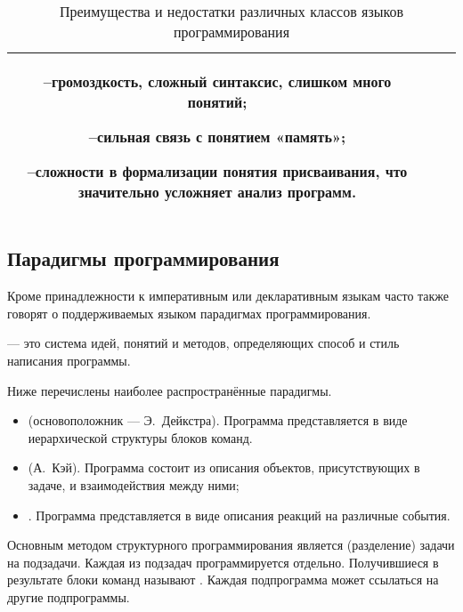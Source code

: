\begin{table}
\begin{centering}
\begin{tabular}{|c|c|c|}
\begin{minipage}[t]{0.42\columnwidth}
        --\enskip громоздкость, сложный синтаксис, слишком много
        понятий;
        
        --\enskip сильная связь с понятием «память»;
        
        --\enskip сложности в формализации понятия присваивания, что
        значительно усложняет анализ программ.
        \par\medskip
      \end{minipage}\\
      \hline 
    \end{tabular}
    \par
  \end{centering}
  
  \caption{Преимущества и недостатки различных классов языков программирования}
  \label{tbl:PLclasses}
\end{table}

\subsection{Парадигмы программирования}

Кроме принадлежности к императивным или декларативным языкам часто
также говорят о поддерживаемых языком парадигмах программирования.

\begin{defn}
   — это
  система идей, понятий и методов, определяющих способ и стиль
  написания программы.
\end{defn}

Ниже перечислены наиболее распространённые парадигмы.

\begin{itemize}
\item {} (основоположник — Э.~Дейкстра). Программа
  представляется в виде иерархической структуры блоков команд.
\item
   (А.~Кэй). Программа состоит из описания
  объектов, присутствующих в задаче, и взаимодействия между ними;
\item
  . Программа представляется в виде описания
  реакций на различные события.
\end{itemize}

Основным методом структурного программирования является
 (разделение) задачи на
подзадачи. Каждая из подзадач программируется отдельно. Получившиеся в
результате блоки команд называют .
Каждая подпрограмма может ссылаться на другие подпрограммы.

